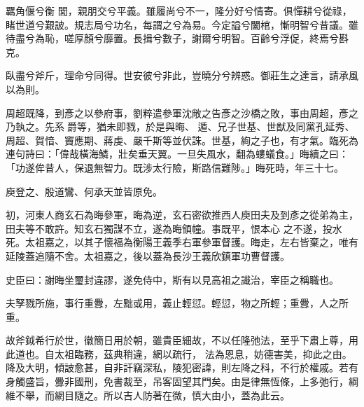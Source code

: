 \begin{pinyinscope}
 羈角偃兮衡
 閭，親朋交兮平義。雖履尚兮不一，隆分好兮情寄。俱憚耕兮從祿，睹世道兮艱詖。規志局兮功名，每謂之兮為易。今定謚兮闔棺，慚明智兮昔議。雖待盡兮為恥，嗟厚顏兮靡置。長揖兮數子，謝爾兮明智。百齡兮浮促，終焉兮斟克。



 臥盡兮斧斤，理命兮同得。世安彼兮非此，豈曉分兮辨惑。御莊生之達言，請承風以為則。



 周超既降，到彥之以參府事，劉粹遣參軍沈敞之告彥之沙橋之敗，事由周超，彥之乃執之。先系爵等，猶未即戮，於是與晦、
 遁、兄子世基、世猷及同黨孔延秀、周超、賀愔、竇應期、蔣虔、嚴千斯等並伏誅。世基，絢之子也，有才氣。臨死為連句詩曰：「偉哉橫海鱗，壯矣垂天翼。一旦失風水，翻為螻蟻食。」晦續之曰：「功遂侔昔人，保退無智力。既涉太行險，斯路信難陟。」晦死時，年三十七。



 庾登之、殷道鸞、何承天並皆原免。



 初，河東人商玄石為晦參軍，晦為逆，玄石密欲推西人庾田夫及到彥之從弟為主，田夫等不敢許。知玄石獨謀不立，遂為晦領幢。事既平，恨本心
 之不遂，投水死。太祖嘉之，以其子懷福為衡陽王義季右軍參軍督護。晦走，左右皆棄之，唯有延陵蓋追隨不舍。太祖嘉之，後以蓋為長沙王義欣鎮軍功曹督護。



 史臣曰：謝晦坐璽封違謬，遂免侍中，斯有以見高祖之識治，宰臣之稱職也。



 夫孥戮所施，事行重釁，左黜或用，義止輕愆。輕愆，物之所輕；重釁，人之所重。



 故斧鉞希行於世，徽簡日用於朝，雖貴臣細故，不以任隆弛法，至乎下肅上尊，用此道也。自太祖臨務，茲典稍違，網以疏行，
 法為恩息，妨德害美，抑此之由。降及大明，傾詖愈甚，自非訐竊深私，陵犯密諱，則左降之科，不行於權戚。若有身觸盛旨，釁非國刑，免書裁至，吊客固望其門矣。由是律無恆條，上多弛行，綱維不舉，而網目隨之。所以吉人防著在微，慎大由小，蓋為此云。



\end{pinyinscope}